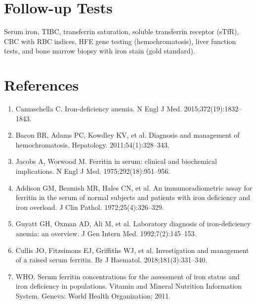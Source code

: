 \section*{Follow-up Tests}
Serum iron, TIBC, transferrin saturation, soluble transferrin receptor (sTfR), CBC with RBC indices, HFE gene testing (hemochromatosis), liver function tests, and bone marrow biopsy with iron stain (gold standard).
\section*{References}
\begin{enumerate}
  \item Camaschella C. Iron-deficiency anemia. N Engl J Med. 2015;372(19):1832--1843.
  \item Bacon BR, Adams PC, Kowdley KV, et al. Diagnosis and management of hemochromatosis. Hepatology. 2011;54(1):328--343.
  \item Jacobs A, Worwood M. Ferritin in serum: clinical and biochemical implications. N Engl J Med. 1975;292(18):951--956.
  \item Addison GM, Beamish MR, Hales CN, et al. An immunoradiometric assay for ferritin in the serum of normal subjects and patients with iron deficiency and iron overload. J Clin Pathol. 1972;25(4):326--329.
  \item Guyatt GH, Oxman AD, Ali M, et al. Laboratory diagnosis of iron-deficiency anemia: an overview. J Gen Intern Med. 1992;7(2):145--153.
  \item Cullis JO, Fitzsimons EJ, Griffiths WJ, et al. Investigation and management of a raised serum ferritin. Br J Haematol. 2018;181(3):331--340.
  \item WHO. Serum ferritin concentrations for the assessment of iron status and iron deficiency in populations. Vitamin and Mineral Nutrition Information System. Geneva: World Health Organization; 2011.
\end{enumerate}
\clearpage
